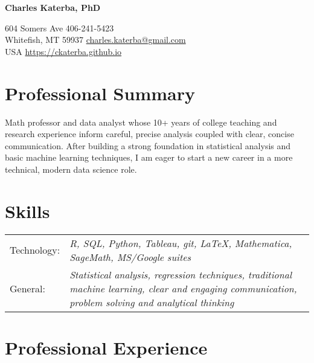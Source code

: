 \documentclass[12pt]{article}
\begin{document}
\begin{center}
     \Huge{\textbf{Charles Katerba, PhD}}
\end{center}
604 Somers Ave \hfill 406-241-5423\\
Whitefish, MT 59937 \hfill \href{mailto:charles.katerba@gmail.com}{charles.katerba@gmail.com} \\ 
USA  \hfill \url{https://ckaterba.github.io}

\section{Professional Summary}

Math professor and data analyst whose 10+ years of college teaching and research experience inform careful, precise analysis coupled with clear, concise communication.  After building a strong foundation in statistical analysis and basic machine learning techniques, I am eager to start a new career in a more technical, modern data science role. 

\section{Skills}

\begin{tabular}{  l p{15in} }

Technology: & \textit{R, SQL, Python, Tableau, git, \LaTeX, Mathematica, SageMath, MS/Google suites}  \\

General: & \textit{Statistical analysis, regression techniques, traditional machine learning, clear and 
\newline engaging communication, problem solving and analytical thinking} 
\end{tabular}

\section{Professional Experience}
\end{document}
